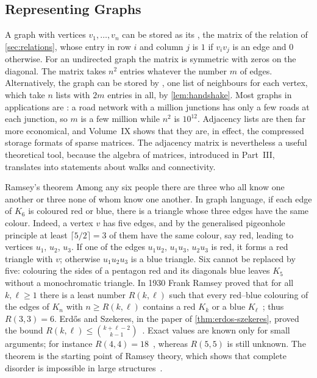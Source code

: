 \subsection{Representing Graphs}

A graph with vertices $v_1,\ldots,v_n$ can be stored as its , the matrix of the relation of \cref{sec:relations}, whose entry in row $i$ and column $j$ is $1$ if $v_iv_j$ is an edge and $0$ otherwise. For an undirected graph the matrix is symmetric with zeros on the diagonal. The matrix takes $n^2$ entries whatever the number $m$ of edges. Alternatively, the graph can be stored by , one list of neighbours for each vertex, which take $n$ lists with $2m$ entries in all, by \cref{lem:handshake}. Most graphs in applications are : a road network with a million junctions has only a few roads at each junction, so $m$ is a few million while $n^2$ is $10^{12}$. Adjacency lists are then far more economical, and Volume~IX shows that they are, in effect, the compressed storage formats of sparse matrices. The adjacency matrix is nevertheless a useful theoretical tool, because the algebra of matrices, introduced in Part~III, translates into statements about walks and connectivity.

\begin{note}{Ramsey's theorem}
Among any six people there are three who all know one another or three none of whom know one another. In graph language, if each edge of $K_6$ is coloured red or blue, there is a triangle whose three edges have the same colour. Indeed, a vertex $v$ has five edges, and by the generalised pigeonhole principle at least $\lceil5/2\rceil=3$ of them have the same colour, say red, leading to vertices $u_1$, $u_2$, $u_3$. If one of the edges $u_1u_2$, $u_1u_3$, $u_2u_3$ is red, it forms a red triangle with $v$; otherwise $u_1u_2u_3$ is a blue triangle. Six cannot be replaced by five: colouring the sides of a pentagon red and its diagonals blue leaves $K_5$ without a monochromatic triangle. In 1930 Frank Ramsey proved that for all $k,\ell\ge1$ there is a least number $R(k,\ell)$ such that every red--blue colouring of the edges of $K_n$ with $n\ge R(k,\ell)$ contains a red $K_k$ or a blue $K_\ell$~\cite{ramsey1930}; thus $R(3,3)=6$. Erd\H{o}s and Szekeres, in the paper of \cref{thm:erdos-szekeres}, proved the bound $R(k,\ell)\le\binom{k+\ell-2}{k-1}$~\cite{erdos1935}. Exact values are known only for small arguments; for instance $R(4,4)=18$~\cite{greenwood1955}, whereas $R(5,5)$ is still unknown. The theorem is the starting point of Ramsey theory, which shows that complete disorder is impossible in large structures~\cite{graham1990ramsey}.
\end{note}

